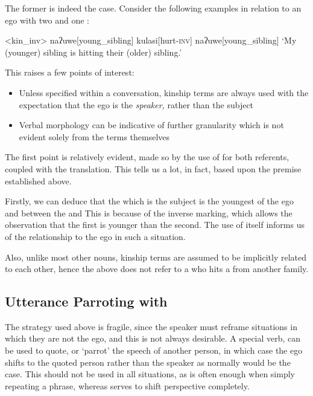 The former is indeed the case.
Consider the following examples in relation to an ego with two  and one :

\ex<kin_inv>
\begingl
naʔuwe[young\_sibling]
kulasi[hurt\textsc{-inv}]
naʔuwe[young\_sibling]
\glft `My (younger) sibling is hitting their (older) sibling.'
\endgl
\xe


This raises a few points of interest:
\begin{itemize}
  \item Unless specified within a conversation, kinship terms are always used with the expectation that the ego is the \textit{speaker,} rather than the subject
  \item Verbal morphology can be indicative of further granularity which is not evident solely from the terms themselves
\end{itemize}

The first point is relatively evident, made so by the use of  for both referents, coupled with the translation.
This tells us a lot, in fact, based upon the premise established above.

Firstly, we can deduce that the  which is the subject is the youngest of the ego and between the  and  This is because of the inverse marking, which allows the observation that the first  is younger than the second.
The use of  itself informs us of the relationship to the ego in such a situation.

Also, unlike most other nouns, kinship terms are assumed to be implicitly related to each other, hence the above does not refer to a  who hits a  from another family.

\subsection{Utterance Parroting with }
The strategy used above is fragile, since the speaker must reframe situations in which they are not the ego, and this is not always desirable.
A special verb,  can be used to quote, or `parrot' the speech of another person, in which case the ego shifts to the quoted person rather than the speaker as normally would be the case.
This should not be used in all situations, as  is often enough when simply repeating a phrase, whereas  serves to shift perspective completely.

